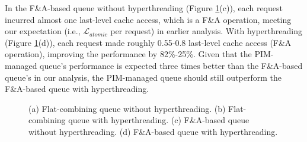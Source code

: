 \documentclass[11pt]{article}
\newcommand{\latato} {\mathcal{L}_{atomic}}
\begin{document}
In the F\&A-based queue without hyperthreading (Figure \ref{figure:FC_FandA_queues}(c)), 
each request incurred almost one last-level cache access, which is a F\&A operation, 
meeting our expectation (i.e., $\latato$ per request) in earlier analysis. 
With hyperthreading (Figure \ref{figure:FC_FandA_queues}(d)), each request made roughly 0.55-0.8 
last-level cache access (F\&A operation), improving the performance by 82\%-25\%.
Given that the PIM-managed queue's performance is expected three times better than the F\&A-based queue's 
in our analysis, the PIM-managed queue should still outperform the F\&A-based queue with hyperthreading. 


\begin{figure}[ht!]
\centering
{}

\caption{(a) Flat-combining queue without hyperthreading. (b) Flat-combining queue with hyperthreading. 
(c) F\&A-based queue without hyperthreading. (d) F\&A-based queue with hyperthreading. }
\label{figure:FC_FandA_queues}
\end{figure}
\end{document}

